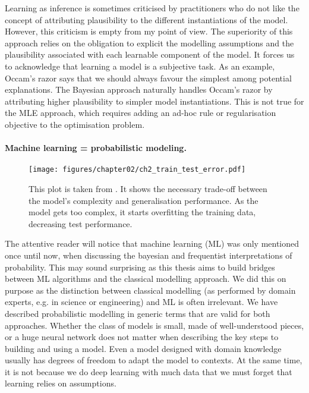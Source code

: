 Learning as inference is sometimes criticised by practitioners who do not like the concept of attributing plausibility to the different instantiations of the model. However, this criticism is empty from my point of view. The superiority of this approach relies on the obligation to explicit the modelling assumptions and the plausibility associated with each learnable component of the model. It forces us to acknowledge that learning a model is a subjective task. As an example, Occam's razor says that we should always favour the simplest among potential explanations. The Bayesian approach naturally handles Occam's razor by attributing higher plausibility to simpler model instantiations. This is not true for the MLE approach, which requires adding an ad-hoc rule or regularisation objective to the optimisation problem.

%
\paragraph{Machine learning = probabilistic modeling.}
\begin{figure}
  \centering
  \texttt{[image: figures/chapter02/ch2\_train\_test\_error.pdf]}
  \caption{This plot is taken from \citet{louppe2014understanding}. It shows the necessary trade-off between the model's complexity and generalisation performance. As the model gets too complex, it starts overfitting the training data, decreasing test performance.}
  \label{fig:ch02:learning_curves}
\end{figure}
The attentive reader will notice that machine learning (ML) was only mentioned once until now, when discussing the bayesian and frequentist interpretations of probability.
This may sound surprising as this thesis aims to build bridges between ML algorithms and the classical modelling approach. We did this on purpose as the distinction between classical modelling (as performed by domain experts, e.g. in science or engineering) and ML is often irrelevant. We have described probabilistic modelling in generic terms that are valid for both approaches. Whether the class of models is small, made of well-understood pieces, or a huge neural network does not matter when describing the key steps to building and using a model. Even a model designed with domain knowledge usually has degrees of freedom to adapt the model to contexts. At the same time, it is not because we do deep learning with much data that we must forget that learning relies on assumptions.

